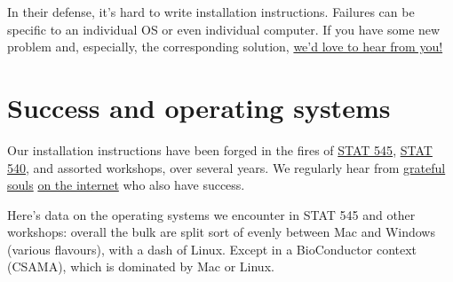 \documentclass[
]{book}
\begin{document}
In their defense, it's hard to write installation instructions. Failures can be specific to an individual OS or even individual computer. If you have some new problem and, especially, the corresponding solution, \href{https://github.com/jennybc/happy-git-with-r/issues}{we'd love to hear from you!}

\section*{Success and operating systems}\label{success-and-operating-systems}

Our installation instructions have been forged in the fires of \href{http://stat545.com}{STAT 545}, \href{https://stat540-ubc.github.io}{STAT 540}, and assorted workshops, over several years. We regularly hear from \href{https://twitter.com/ibddoctor/status/777610645617475584}{grateful souls} \href{https://twitter.com/millsGT49/status/647059167509921793}{on the internet} who also have success.

Here's data on the operating systems we encounter in STAT 545 and other workshops: overall the bulk are split sort of evenly between Mac and Windows (various flavours), with a dash of Linux. Except in a BioConductor context (CSAMA), which is dominated by Mac or Linux.
\end{document}
